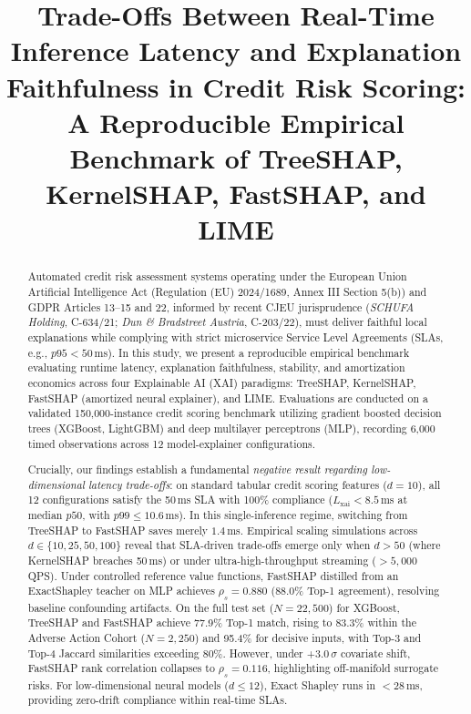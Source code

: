 \documentclass[conference]{IEEEtran}
\begin{document}
\title{Trade-Offs Between Real-Time Inference Latency and Explanation Faithfulness in Credit Risk Scoring: A Reproducible Empirical Benchmark of TreeSHAP, KernelSHAP, FastSHAP, and LIME}

\author{
}

\maketitle

\begin{abstract}
Automated credit risk assessment systems operating under the European Union Artificial Intelligence Act (Regulation (EU) 2024/1689, Annex III Section 5(b)) and GDPR Articles 13--15 and 22, informed by recent CJEU jurisprudence (\textit{SCHUFA Holding}, C-634/21; \textit{Dun \& Bradstreet Austria}, C-203/22), must deliver faithful local explanations while complying with strict microservice Service Level Agreements (SLAs, e.g., $p95 < 50$\,ms). 
In this study, we present a reproducible empirical benchmark evaluating runtime latency, explanation faithfulness, stability, and amortization economics across four Explainable AI (XAI) paradigms: TreeSHAP, KernelSHAP, FastSHAP (amortized neural explainer), and LIME. 
Evaluations are conducted on a validated 150,000-instance credit scoring benchmark utilizing gradient boosted decision trees (XGBoost, LightGBM) and deep multilayer perceptrons (MLP), recording 6,000 timed observations across 12 model-explainer configurations.

Crucially, our findings establish a fundamental \textit{negative result regarding low-dimensional latency trade-offs}: on standard tabular credit scoring features ($d=10$), all 12 configurations satisfy the 50\,ms SLA with 100\% compliance ($L_{\text{xai}} < 8.5$\,ms at median $p50$, with $p99 \le 10.6$\,ms). In this single-inference regime, switching from TreeSHAP to FastSHAP saves merely $1.4$\,ms. Empirical scaling simulations across $d \in \{10, 25, 50, 100\}$ reveal that SLA-driven trade-offs emerge only when $d > 50$ (where KernelSHAP breaches 50\,ms) or under ultra-high-throughput streaming ($>5,000$ QPS). 
Under controlled reference value functions, FastSHAP distilled from an ExactShapley teacher on MLP achieves $\rho_s = 0.880$ (88.0\% Top-1 agreement), resolving baseline confounding artifacts. On the full test set ($N=22,500$) for XGBoost, TreeSHAP and FastSHAP achieve 77.9\% Top-1 match, rising to 83.3\% within the Adverse Action Cohort ($N=2,250$) and 95.4\% for decisive inputs, with Top-3 and Top-4 Jaccard similarities exceeding 80\%. However, under +3.0\,$\sigma$ covariate shift, FastSHAP rank correlation collapses to $\rho_s = 0.116$, highlighting off-manifold surrogate risks. For low-dimensional neural models ($d \le 12$), Exact Shapley runs in $<28$\,ms, providing zero-drift compliance within real-time SLAs.
\end{abstract}
\end{document}
